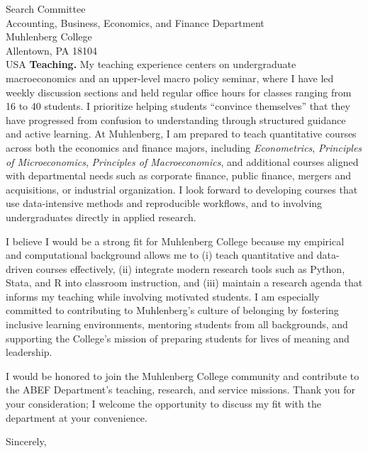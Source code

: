 \documentclass[11pt,letterpaper]{letter}
\begin{document}
\begin{letter}{Search Committee \\
Accounting, Business, Economics, and Finance Department \\
Muhlenberg College \\
Allentown, PA 18104 \\ USA}
\textbf{Teaching.} My teaching experience centers on undergraduate macroeconomics and an upper-level macro policy seminar, where I have led weekly discussion sections and held regular office hours for classes ranging from 16 to 40 students. I prioritize helping students “convince themselves” that they have progressed from confusion to understanding through structured guidance and active learning. At Muhlenberg, I am prepared to teach quantitative courses across both the economics and finance majors, including \textit{Econometrics}, \textit{Principles of Microeconomics}, \textit{Principles of Macroeconomics}, and additional courses aligned with departmental needs such as corporate finance, public finance, mergers and acquisitions, or industrial organization. I look forward to developing courses that use data-intensive methods and reproducible workflows, and to involving undergraduates directly in applied research.

I believe I would be a strong fit for Muhlenberg College because my empirical and computational background allows me to (i) teach quantitative and data-driven courses effectively, (ii) integrate modern research tools such as Python, Stata, and R into classroom instruction, and (iii) maintain a research agenda that informs my teaching while involving motivated students. I am especially committed to contributing to Muhlenberg’s culture of belonging by fostering inclusive learning environments, mentoring students from all backgrounds, and supporting the College’s mission of preparing students for lives of meaning and leadership.

I would be honored to join the Muhlenberg College community and contribute to the ABEF Department's teaching, research, and service missions. Thank you for your consideration; I welcome the opportunity to discuss my fit with the department at your convenience.

\closing{Sincerely,}

\end{letter}
\end{document}
